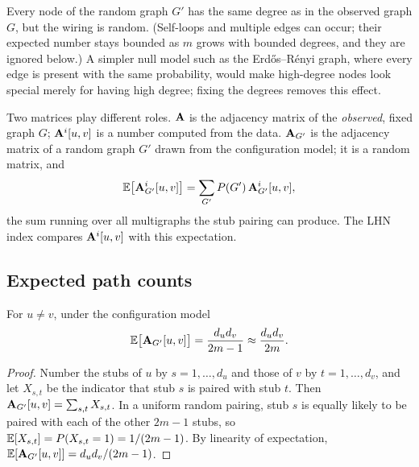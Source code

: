 \begin{notechapter}
Every node of the random graph $G'$ has the same degree as in the observed graph $G$, but the wiring is random. (Self-loops and multiple edges can occur; their expected number stays bounded as $m$ grows with bounded degrees, and they are ignored below.) A simpler null model such as the Erd\H{o}s--R\'enyi graph, where every edge is present with the same probability, would make high-degree nodes look special merely for having high degree; fixing the degrees removes this effect.

\begin{pitfall}
Two matrices play different roles. $\mathbf{A}$ is the adjacency matrix of the \emph{observed}, fixed graph $G$; $\mathbf{A}^i[u,v]$ is a number computed from the data. $\mathbf{A}_{G'}$ is the adjacency matrix of a random graph $G'$ drawn from the configuration model; it is a random matrix, and
\begin{equation}
\mathbb{E}\bigl[\mathbf{A}_{G'}^i[u,v]\bigr] = \sum_{G'} P(G')\,\mathbf{A}_{G'}^i[u,v],
\label{node-similarity:eq:expectation-formal}
\end{equation}
the sum running over all multigraphs the stub pairing can produce. The LHN index compares $\mathbf{A}^i[u,v]$ with this expectation.
\end{pitfall}

\subsection{Expected path counts}

\begin{proposition}\label{node-similarity:prop:expected-edge}
For $u \ne v$, under the configuration model
\begin{equation}
\mathbb{E}\bigl[\mathbf{A}_{G'}[u,v]\bigr] = \frac{d_u d_v}{2m - 1} \approx \frac{d_u d_v}{2m}.
\label{node-similarity:eq:expected-edge}
\end{equation}
\end{proposition}

\begin{proof}
Number the stubs of $u$ by $s = 1, \ldots, d_u$ and those of $v$ by $t = 1, \ldots, d_v$, and let $X_{s,t}$ be the indicator that stub $s$ is paired with stub $t$. Then $\mathbf{A}_{G'}[u,v] = \sum_{s,t} X_{s,t}$. In a uniform random pairing, stub $s$ is equally likely to be paired with each of the other $2m - 1$ stubs, so $\mathbb{E}[X_{s,t}] = P(X_{s,t} = 1) = 1/(2m-1)$. By linearity of expectation, $\mathbb{E}[\mathbf{A}_{G'}[u,v]] = d_ud_v/(2m-1)$.
\end{proof}


\end{notechapter}
